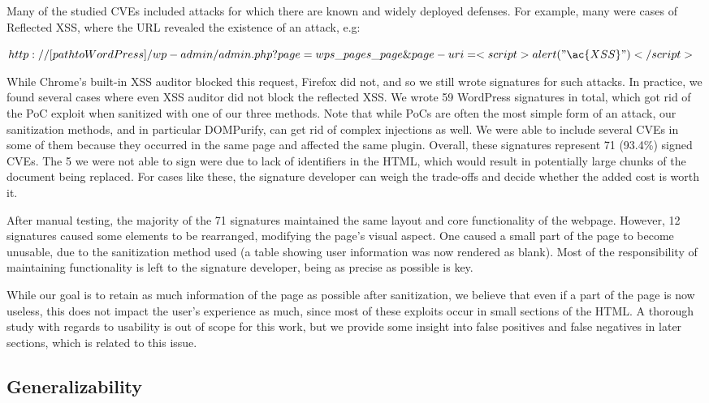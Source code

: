 Many of the studied CVEs included attacks for which there are known and widely deployed defenses. For example, many were cases of Reflected \ac{XSS}, where the URL revealed the existence of an attack, e.g:


$http://[path to WordPress]/wp-admin/admin.php?page=wps\_pages\_page\&page-uri=<script>alert("\ac{XSS}")</script>$

While Chrome's built-in \ac{XSS} auditor blocked this request, Firefox did not, and so we still wrote signatures for such attacks. In practice, we found several cases where even XSS auditor did not block the reflected XSS. We wrote 59 WordPress signatures in total, which got rid of the PoC exploit when sanitized with one of our three methods. Note that while PoCs are often the most simple form of an attack, our sanitization methods, and in particular DOMPurify, can get rid of complex injections as well. We were able to include several CVEs in some of them because they occurred in the same page and affected the same plugin. Overall, these signatures represent 71 (93.4\%) signed CVEs. The 5 we were not able to sign were due to lack of identifiers in the HTML, which would result in potentially large chunks of the document being replaced. For cases like these, the signature developer can weigh the trade-offs and decide whether the added cost is worth it.

After manual testing, the majority of the 71 signatures maintained the same layout and core functionality of the webpage. However, 12 signatures caused some elements to be rearranged, modifying the page's visual aspect. One caused a small part of the page to become unusable, due to the sanitization method used (a table showing user information was now rendered as blank). Most of the responsibility of maintaining functionality is left to the signature developer, being as precise as possible is key.

While our goal is to retain as much information of the page as possible after sanitization, we believe that even if a part of the page is now useless, this does not impact the user's experience as much, since most of these exploits occur in small sections of the HTML. A thorough study with regards to usability is out of scope for this work, but we provide some insight into false positives and false negatives in later sections, which is related to this issue.

\subsection{Generalizability} \label{generalizability}


